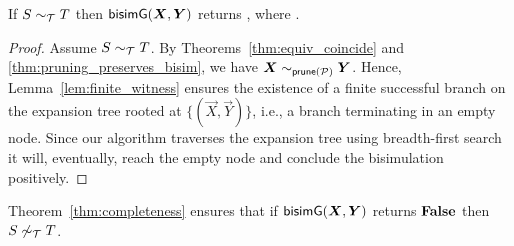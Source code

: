 \begin{theorem}[Completeness]
\label{thm:completeness}
  If $S \sim_\mathcal T T$ then $\Bisim(\vec X, \vec Y)$ returns
  , where \grmcontext.
\end{theorem}
%
\begin{proof}
  Assume $S \sim_\mathcal T T$. By Theorems~\ref{thm:equiv_coincide}
  and \ref{thm:pruning_preserves_bisim},
  we have $\vec X \sim_{\Prune(\productions)} \vec Y$.  Hence,
  Lemma~\ref{lem:finite_witness} ensures the existence of a finite
  successful branch on the expansion tree rooted at
  $\{(\vec X,\vec Y)\}$, i.e., a branch terminating in an empty
  node.  Since our algorithm traverses the expansion tree using
  breadth-first search it will, eventually, reach the empty node and
  conclude the bisimulation positively.
\end{proof}

Theorem~\ref{thm:completeness} ensures that if $\Bisim(\vec X,\vec Y)$
returns $\mathbf{False}$ then $S \not\sim_\mathcal T T$. 


